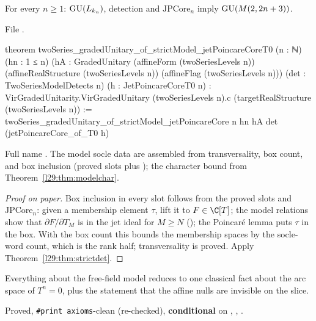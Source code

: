 \begin{theorem}\label{l29:thm:strictpoincare}
For every $n\ge1$: $\mathrm{GU}(L_{k_n})$, detection and $\mathrm{JPCore}_n$ imply $\mathrm{GU}(M(2,2n+3))$.
\end{theorem}

\noindent File .
\begin{leancode}
theorem twoSeries_gradedUnitary_of_strictModel_jetPoincareCoreT0 (n : ℕ) (hn : 1 ≤ n)
    (hA : GradedUnitary (affineForm (twoSeriesLevels n)) (affineRealStructure (twoSeriesLevels n))
      (affineFlag (twoSeriesLevels n)))
    (det : TwoSeriesModelDetects n) (h : JetPoincareCoreT0 n) :
    VirGradedUnitarity.VirGradedUnitary (twoSeriesLevels n).c
      (targetRealStructure (twoSeriesLevels n)) :=
  twoSeries_gradedUnitary_of_strictModel_jetPoincareCore n hn hA det (jetPoincareCore_of_T0 h)
\end{leancode}

\begin{dictionary}
Full name . The model socle
data are assembled from transversality, box count, and box inclusion (proved slots plus ); the character bound
from Theorem~\ref{l29:thm:modelchar}.
\end{dictionary}

\begin{proof}[Proof on paper]
Box inclusion in every slot follows from the proved slots and $\mathrm{JPCore}_n$: given a membership element $\tau$,
lift it to $F\in\C[T]$; the model relations show that $\partial F/\partial T_M$ is in the jet ideal for $M\ge N$
(); the Poincar\'e lemma puts $\tau$ in the box. With the box count this bounds the
membership spaces by the socle-word count, which is the rank half; transversality is proved. Apply
Theorem~\ref{l29:thm:strictdet}.
\end{proof}

\begin{physics}
Everything about the free-field model reduces to one classical fact about the arc space of $T^n=0$, plus the
statement that the affine nulls are invisible on the slice.
\end{physics}

\begin{status}
Proved, \texttt{\#print axioms}-clean (re-checked), \textbf{conditional} on , , .
\end{status}

